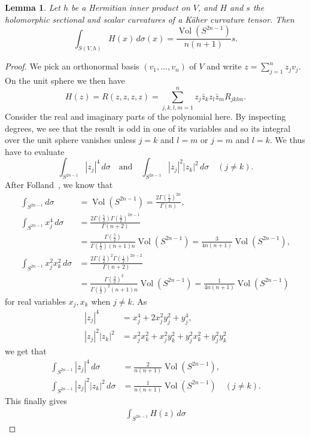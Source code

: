 \documentclass[11pt]{article}
\newtheorem{lemm}[theo]{Lemma}
\theoremstyle{definition}
\DeclareMathOperator{\Vol}{Vol}
\begin{document}
\begin{lemm}
\label{holomorphic-sectional-to-scalar}
Let $h$ be a Hermitian inner product on $V$, and $H$ and $s$ the holomorphic sectional and scalar curvatures of a K\"aher curvature tensor. Then
$$
\int_{S(V,h)} H(x) \, d\sigma(x) = \frac{\Vol(S^{2n-1})}{n(n+1)} s.
$$
\end{lemm}

\begin{proof}
  We pick an orthonormal basis $(v_1,\ldots,v_n)$ of $V$ and write $z = \sum_{j=1}^n z_j v_j$. On the unit sphere we then have
$$
H(z)
= R(z,z,z,z)
= \sum_{j,k,l,m=1}^n z_j \bar z_k z_l \bar z_m R_{jklm}.
$$
Consider the real and imaginary parts of the polynomial here. By inspecting degrees, we see that the result is odd in one of its variables and so its integral over the unit sphere vanishes unless $j = k$ and $l = m$ or $j = m$ and $l = k$. We thus have to evaluate
$$
\int_{S^{2n-1}} |z_j|^4 \, d\sigma
\quad\text{and}\quad
\int_{S^{2n-1}} |z_j|^2 |z_k|^2 \, d\sigma
\quad(j \not= k).
$$
After Folland~\cite{folland}, we know that
\begin{align*}
\int_{S^{2n-1}} d\sigma
&= \Vol(S^{2n-1}) = \frac{2\Gamma(\tfrac12)^{2n}}{\Gamma(n)},
\\
\int_{S^{2n-1}} x_j^4 \, d\sigma
&= \frac{2\Gamma(\tfrac 52)\Gamma(\tfrac 12)^{2n-1}}{\Gamma(n+2)}
\\
&= \frac{\Gamma(\tfrac52)}{\Gamma(\tfrac12)(n+1)n} \Vol(S^{2n-1})
= \frac{3}{4n(n+1)} \Vol(S^{2n-1}),
\\
\int_{S^{2n-1}} x_j^2 x_k^2 \, d\sigma
&= \frac{2\Gamma(\tfrac32)^2\Gamma(\tfrac 12)^{2n-2}}{\Gamma(n+2)}
\\
&= \frac{\Gamma(\tfrac32)^2}{\Gamma(\tfrac12)^2 (n+1)n} \Vol(S^{2n-1})
= \frac{1}{4n(n+1)} \Vol(S^{2n-1})
\end{align*}
for real variables $x_j, x_k$ when $j \not= k$. As
\begin{align*}
|z_j|^4 &= x_j^4 + 2 x_j^2 y_j^2 + y_j^4,
\\
|z_j|^2 |z_k|^2 &= x_j^2 x_k^2 + x_j^2 y_k^2 + y_j^2 x_k^2 + y_j^2 y_k^2
\end{align*}
we get that
\begin{align*}
\int_{S^{2n-1}} |z_j|^4 \, d\sigma
&= \frac{2}{n(n+1)} \Vol(S^{2n-1}),
\\
\int_{S^{2n-1}} |z_j|^2 |z_k|^2 \, d\sigma
&= \frac{1}{n(n+1)} \Vol(S^{2n-1})
\quad(j \not= k).
\end{align*}
This finally gives
\begin{align*}
\int_{S^{2n-1}} H(z) \,d\sigma

\end{align*}
\end{proof}
\end{document}
